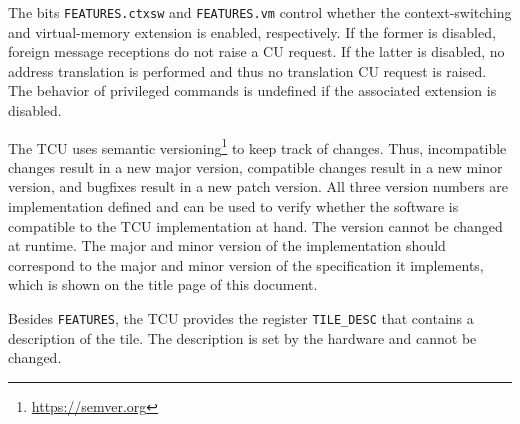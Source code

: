The bits \texttt{FEATURES.ctxsw} and \texttt{FEATURES.vm} control whether the context-switching and
virtual-memory extension is enabled, respectively. If the former is disabled, foreign message
receptions do not raise a CU request. If the latter is disabled, no address translation is
performed and thus no translation CU request is raised. The behavior of privileged commands is
undefined if the associated extension is disabled.

The TCU uses semantic versioning\footnote{\url{https://semver.org}} to keep track of changes. Thus,
incompatible changes result in a new major version, compatible changes result in a new minor
version, and bugfixes result in a new patch version. All three version numbers are implementation
defined and can be used to verify whether the software is compatible to the TCU implementation at
hand. The version cannot be changed at runtime. The major and minor version of the implementation
should correspond to the major and minor version of the specification it implements, which is shown
on the title page of this document.

Besides \texttt{FEATURES}, the TCU provides the register \texttt{TILE\_DESC} that contains a
description of the tile. The description is set by the hardware and cannot be changed.


